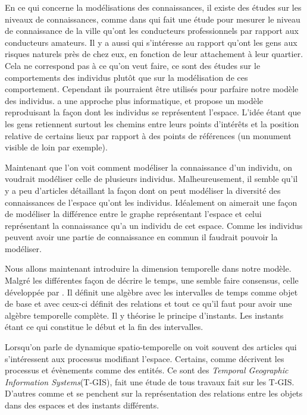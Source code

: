 \documentclass[a4paper]{article}
\begin{document}
En ce qui concerne la modélisations des connaissances, il existe des études sur
les niveaux de connaissances, comme dans \cite{stern1988} qui fait une étude
pour mesurer le niveau de connaissance de la ville qu'ont les conducteurs
professionnels par rapport aux conducteurs amateurs. Il y a aussi
\cite{quinn2018} qui s'intéresse au rapport qu'ont les gens aux risques naturels
près de chez eux, en fonction de leur attachement à leur quartier. Cela ne
correspond pas à ce qu'on veut faire, ce sont des études sur le comportements
des individus plutôt que sur la modélisation de ces comportement. Cependant ils
pourraient être utilisés pour parfaire notre modèle des individus.
\cite{kuipers1978} a une approche plus informatique, et propose un modèle
reproduisant la façon dont les individus se représentent l'espace. L'idée étant
que les gens retiennent surtout les chemins entre leurs points d'intérêts et la
position relative de certains lieux par rapport à des points de références (un
monument visible de loin par exemple).

Maintenant que l'on voit comment modéliser la connaissance d'un individu, on
voudrait modéliser celle de plusieurs individus. Malheureusement, il semble
qu'il y a peu d'articles détaillant la façon dont on peut modéliser la diversité
des connaissances de l'espace qu'ont les individus. Idéalement on aimerait une
façon de modéliser la différence entre le graphe représentant l'espace et celui
représentant la connaissance qu'a un individu de cet espace. Comme les
individus peuvent avoir une partie de connaissance en commun il faudrait pouvoir
la modéliser.

Nous allons maintenant introduire la dimension temporelle dans notre modèle.
Malgré les différentes façon de décrire le temps, une semble faire consensus,
celle développée par \cite{allen1985}. Il définit une algèbre avec les
intervalles de temps comme objet de base et avec ceux-ci définit des relations
et tout ce qu'il faut pour avoir une algèbre temporelle complète. Il y théorise
le principe d'instants. Les instants étant ce qui constitue le début et la fin
des intervalles.

Lorsqu'on parle de dynamique spatio-temporelle on voit souvent des articles qui
s'intéressent aux processus modifiant l'espace. Certains, comme\linebreak
\cite{claramunt1995} décrivent les processus et évènements comme des entités.
Ce sont des \emph{Temporal Geographic Information Systems}(T-GIS),
\cite{siabato2018} fait une étude de tous travaux fait sur les T-GIS. D'autres
comme \cite{delmondo2011} et \cite{costes2015} se penchent sur la représentation
des relations entre les objets dans des espaces et des instants différents.
\end{document}
